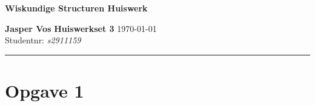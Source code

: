 \documentclass{article}
\begin{document}
{\Large \textbf{Wiskundige Structuren Huiswerk}}

\bigskip

\textbf{Jasper Vos} \hfill \textbf{Huiswerkset 3} \hfill \today \\
Studentnr: \emph{s2911159}

\rule{\textwidth}{2pt}

\bigskip

\newcommand{\N}{\mathbb{N}}
\newcommand{\f}[2]{\frac{#1}{#2}}
\newcommand{\tx}[1]{\text{#1}}
\newcommand{\cn}[1]{\cancel{#1}}
\newcommand{\R}{\mathbb{R}}
\newcommand{\Rho}{\mathcal{P}}
\newcommand{\en}{\tx{ en }}
\newcommand{\of}{\tx{ of }}

\section*{Opgave 1}
\end{document}
